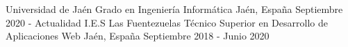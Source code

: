 

\begin{cventries}

  \cventry
    {Universidad de Jaén} %
    {Grado en Ingeniería Informática} %
    {Jaén, España} %
    {Septiembre 2020 - Actualidad} %
    {
    }
  \cventry
    {I.E.S Las Fuentezuelas} %
    {Técnico Superior en Desarrollo de Aplicaciones Web} %
    {Jaén, España} %
    {Septiembre 2018 - Junio 2020} %
    {
    }
\end{cventries}
